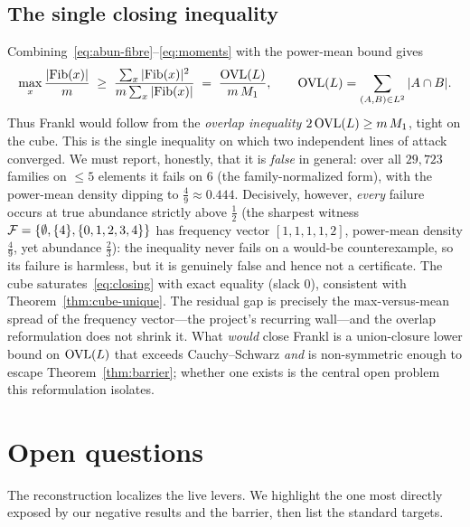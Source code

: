 \documentclass[11pt]{amsart}
\theoremstyle{definition}
\theoremstyle{remark}
\begin{document}
\subsection{The single closing inequality}\label{ssec:closing}
Combining~\eqref{eq:abun-fibre}--\eqref{eq:moments} with the power-mean bound gives
\begin{equation}\label{eq:closing}
   \max_x\frac{|\mathrm{Fib}(x)|}{m}\;\ge\;\frac{\sum_x|\mathrm{Fib}(x)|^2}{m\sum_x|\mathrm{Fib}(x)|}
   \;=\;\frac{\mathrm{OVL}(L)}{m\,M_1},\qquad \mathrm{OVL}(L)=\sum_{(A,B)\in L^2}|A\cap B| .
\end{equation}
Thus Frankl would follow from the \emph{overlap inequality}
$2\,\mathrm{OVL}(L)\ge m\,M_1$, tight on the cube. This is the single inequality on
which two independent lines of attack converged. We must report, honestly, that it
is \emph{false} in general: over all $29{,}723$ families on $\le 5$ elements it
fails on $6$ (the family-normalized form), with the power-mean density dipping to
$\tfrac49\approx 0.444$.
Decisively, however, \emph{every} failure occurs at true abundance strictly above
$\tfrac12$ (the sharpest witness $\mathcal{F}=\{\emptyset,\{4\},\{0,1,2,3,4\}\}$ has
frequency vector $[1,1,1,1,2]$, power-mean density $\tfrac49$, yet abundance
$\tfrac23$): the inequality never fails on a would-be counterexample, so its
failure is harmless, but it is genuinely false and hence not a certificate. The
cube saturates~\eqref{eq:closing} with exact equality (slack $0$), consistent with
Theorem~\ref{thm:cube-unique}. The residual gap is precisely the max-versus-mean
spread of the frequency vector---the project's recurring wall---and the overlap
reformulation does not shrink it. What \emph{would} close Frankl is a
union-closure lower bound on $\mathrm{OVL}(L)$ that exceeds Cauchy--Schwarz \emph{and}
is non-symmetric enough to escape Theorem~\ref{thm:barrier}; whether one exists is
the central open problem this reformulation isolates.

\section{Open questions}
\label{sec:open}

The reconstruction localizes the live levers. We highlight the one most directly
exposed by our negative results and the barrier, then list the standard targets.
\end{document}
